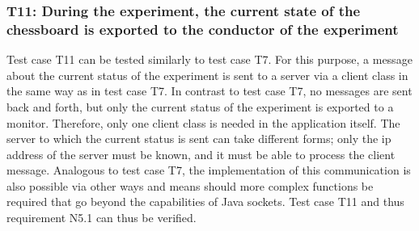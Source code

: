 
\newpage




\subsubsection*{T11: During the experiment, the current state of the chessboard is exported to the conductor of the experiment}

Test case T11 can be tested similarly to test case T7. For this purpose, a message about the current status of the experiment is sent to a server via a client class in the same way as in test case T7. In contrast to test case T7, no messages are sent back and forth, but only the current status of the experiment is exported to a monitor. Therefore, only one client class is needed in the application itself. The server to which the current status is sent can take different forms; only the \ac{ip} address of the server must be known, and it must be able to process the client message. Analogous to test case T7, the implementation of this communication is also possible via other ways and means should more complex functions be required that go beyond the capabilities of Java sockets. Test case T11 and thus requirement N5.1 can thus be verified.

\newpage

